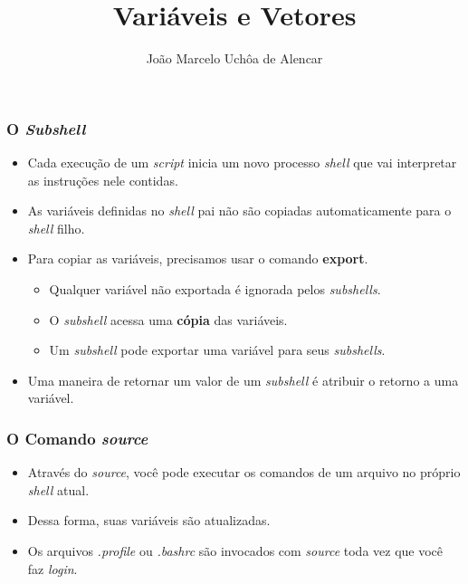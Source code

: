 \documentclass{beamer}
\title{Variáveis e Vetores}
\author[João Marcelo Uchôa de Alencar]{João Marcelo Uchôa de Alencar}
\institute{Universidade Federal do Ceará - Quixadá}
\begin{document}
   \begin{frame}
      \titlepage
   \end{frame}

   \begin{frame}
      \frametitle{O \textit{Subshell}}
      \begin{itemize}
         \item Cada execução de um \textit{script} inicia um novo processo \textit{shell} que vai interpretar as instruções nele contidas. 
         \item As variáveis definidas no \textit{shell} pai não são copiadas automaticamente para o \textit{shell} filho. 
         \item Para copiar as variáveis, precisamos usar o comando \textbf{export}. 
         \begin{itemize}
            \item Qualquer variável não exportada é ignorada pelos \textit{subshells}.
	    \item O \textit{subshell} acessa uma \textbf{cópia} das variáveis.
	    \item Um \textit{subshell} pode exportar uma variável para seus \textit{subshells}.
         \end{itemize}
         \item Uma maneira de retornar um valor de um \textit{subshell} é atribuir o retorno a uma variável.
	 \end{itemize}
   \end{frame}

   \begin{frame}
      \frametitle{O Comando \textit{source}}
      \begin{itemize}
         \item Através do \textit{source}, você pode executar os comandos de um arquivo no próprio \textit{shell} atual. 
         \item Dessa forma, suas variáveis são atualizadas.
         \item Os arquivos \textit{.profile} ou \textit{.bashrc} são invocados com \textit{source} toda vez que você faz \textit{login}.  
      \end{itemize}
   \end{frame}
\end{document}

